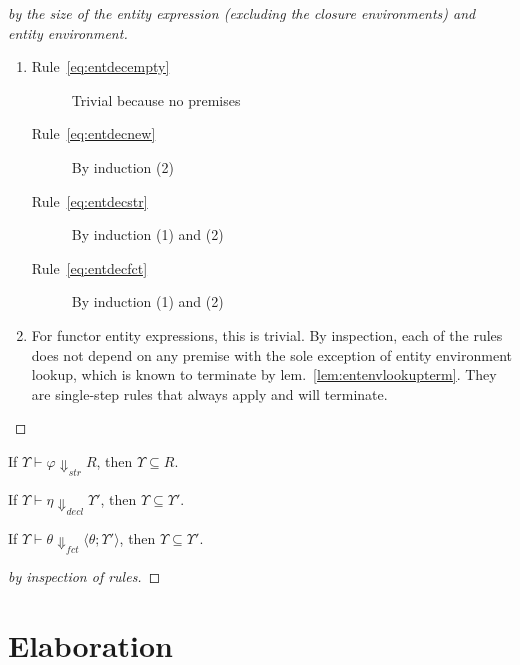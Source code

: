\begin{proof}[by the size of the entity expression (excluding the closure environments) and entity environment]
\begin{enumerate}
\item \begin{description}
  \item[Rule~\ref{eq:entdecempty}] Trivial because no premises
  \item[Rule~\ref{eq:entdecnew}] By induction (2) 
  \item[Rule~\ref{eq:entdecstr}] By induction (1) and (2)
  \item[Rule~\ref{eq:entdecfct}] By induction (1) and (2)
\end{description}
\item For functor entity expressions, this is trivial. By inspection, each of the rules does not depend on any premise with the sole exception of entity environment lookup, which is known to terminate by lem.~\ref{lem:entenvlookupterm}. They are single-step rules that always apply and will terminate. 
\end{enumerate}
\end{proof}

\begin{lemma}\label{lem:entevalclosed}
If $\Upsilon \vdash \varphi \Downarrow_{str} R$, then
$\Upsilon\subseteq R$.

If $\Upsilon\vdash \eta \Downarrow_{decl} \Upsilon'$, then 
$\Upsilon \subseteq \Upsilon'$.

If $\Upsilon\vdash \theta \Downarrow_{fct}
\langle\theta;\Upsilon'\rangle$, then $\Upsilon\subseteq\Upsilon'$. 
\end{lemma}
\begin{proof}[by inspection of rules]
\end{proof}

\section{Elaboration}

